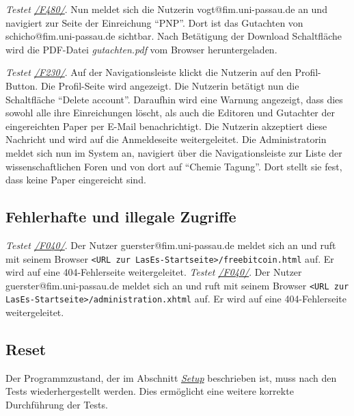 \begin{description}

	 \emph{Testet \hyperref[funkt:480]{/F480/}}.
	Nun meldet sich die Nutzerin vogt@fim.uni-passau.de an und navigiert zur Seite der Einreichung ``P\neq NP''.
	Dort ist das Gutachten von schicho@fim.uni-passau.de sichtbar.
	Nach Betätigung der Download Schaltfläche wird die PDF-Datei \emph{gutachten.pdf} vom Browser heruntergeladen.

	 \emph{Testet \hyperref[funkt:230]{/F230/}}.
	Auf der Navigationsleiste klickt die Nutzerin auf den Profil-Button.
	Die Profil-Seite wird angezeigt.
	Die Nutzerin betätigt nun die Schaltfläche ``Delete account''.
	Daraufhin wird eine Warnung angezeigt, dass dies sowohl alle ihre Einreichungen löscht, als auch die Editoren und Gutachter der eingereichten Paper per E-Mail benachrichtigt.
	Die Nutzerin akzeptiert diese Nachricht und wird auf die Anmeldeseite weitergeleitet.
	Die Administratorin meldet sich nun im System an, navigiert über die Navigationsleiste zur Liste der wissenschaftlichen Foren und von dort auf ``Chemie Tagung''.
	Dort stellt sie fest, dass keine Paper eingereicht sind.

\end{description}

\subsection{Fehlerhafte und illegale Zugriffe}

\begin{description}
	 \emph{Testet \hyperref[funkt:040]{/F040/}}.
	Der Nutzer guerster@fim.uni-passau.de meldet sich an und ruft mit seinem Browser \texttt{<URL zur LasEs-Startseite>/freebitcoin.html} auf.
	Er wird auf eine 404-Fehlerseite weitergeleitet.
	 \emph{Testet \hyperref[funkt:040]{/F040/}}.
	Der Nutzer guerster@fim.uni-passau.de meldet sich an und ruft mit seinem Browser \texttt{<URL zur LasEs-Startseite>/administration.xhtml} auf.
	Er wird auf eine 404-Fehlerseite weitergeleitet.
\end{description}

\subsection{Reset}
Der Programmzustand, der im Abschnitt \emph{\hyperref[setup]{Setup}} beschrieben ist, muss nach den Tests wiederhergestellt werden.
Dies ermöglicht eine weitere korrekte Durchführung der Tests.



